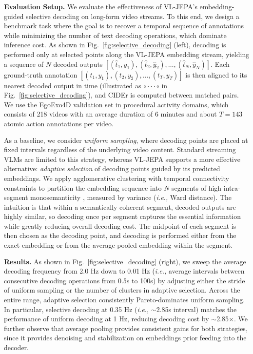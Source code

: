 \textbf{Evaluation Setup.} We evaluate the effectiveness of VL-JEPA’s embedding-guided selective decoding on long-form video streams.  To this end, we design a benchmark task where the goal is to recover a temporal sequence of annotations while minimizing the number of text decoding operations, which dominate inference cost. As shown in Fig.~\ref{fig:selective_decoding} (left), decoding is performed only at selected points along the VL-JEPA embedding stream, yielding a sequence of $N$ decoded outputs $[(\hat{t}_1, \hat{y}_1), (\hat{t}_2, \hat{y}_2), \ldots, (\hat{t}_N, \hat{y}_N)]$. Each ground-truth annotation $[(t_1, y_1), (t_2, y_2), \ldots, (t_T, y_T)]$ is then aligned to its nearest decoded output in time (illustrated as $\circ \cdot \cdot \cdot \circ$ in Fig.~\ref{fig:selective_decoding}), and CIDEr is computed between matched pairs. We use the EgoExo4D \citep{grauman2024ego} validation set in procedural activity domains, which consists of 218 videos with an average duration of 6 minutes and about $T=143$ atomic action annotations per video.


As a baseline, we consider \textit{uniform sampling}, where decoding points are placed at fixed intervals regardless of the underlying video content. Standard streaming VLMs are limited to this strategy, whereas VL-JEPA supports a more effective alternative: \textit{adaptive selection} of decoding points guided by its predicted embeddings. We apply agglomerative clustering with temporal connectivity constraints \citep{murtagh2012algorithms} to partition the embedding sequence into $N$ segments of high intra-segment monosemanticity \citep{chen2024subobject}, measured by variance (\textit{i.e.,} Ward distance). The intuition is that within a semantically coherent segment, decoded outputs are highly similar, so decoding once per segment captures the essential information while greatly reducing overall decoding cost. The midpoint of each segment is then chosen as the decoding point, and decoding is performed either from the exact embedding or from the average-pooled embedding within the segment. 


\textbf{Results.} As shown in Fig.~\ref{fig:selective_decoding} (right), we sweep the average decoding frequency from 2.0 Hz down to 0.01 Hz (\textit{i.e.,} average intervals between consecutive decoding operations from 0.5s to 100s) by adjusting either the stride of uniform sampling or the number of clusters in adaptive selection. Across the entire range, adaptive selection consistently Pareto-dominates uniform sampling. In particular, selective decoding at 0.35 Hz (\textit{i.e.,} $\sim$2.85s interval) matches the performance of uniform decoding at 1 Hz, reducing decoding cost by $\sim$2.85$\times$. We further observe that average pooling provides consistent gains for both strategies, since it provides denoising and stabilization on embeddings prior feeding into the decoder.




